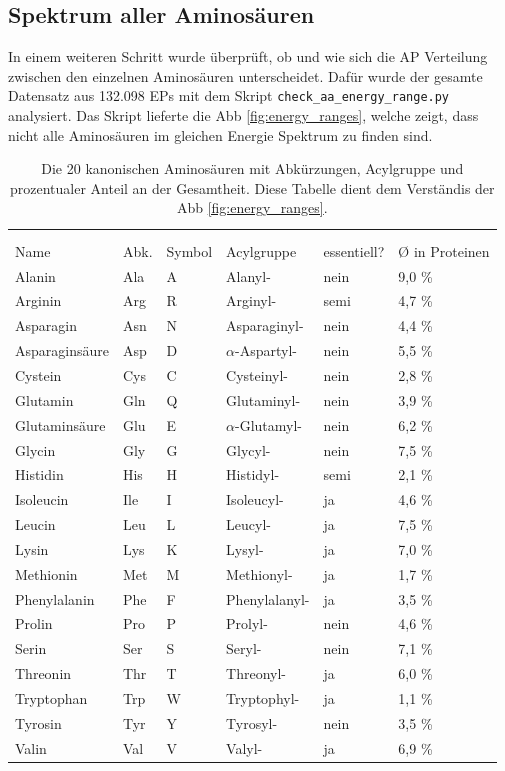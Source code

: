 \subsection{Spektrum aller Aminosäuren}
In einem weiteren Schritt wurde überprüft, ob und wie sich die \ac{AP} Verteilung zwischen den einzelnen Aminosäuren unterscheidet. Dafür wurde der gesamte Datensatz aus 132.098 \ac{EPs} mit dem Skript \texttt{check\_aa\_energy\_range.py} analysiert. Das Skript lieferte die \ac{Abb} \ref{fig:energy_ranges}, welche zeigt, dass nicht alle Aminosäuren im gleichen Energie Spektrum zu finden sind. %
\begin{table}[]
\centering
\begin{tabular}{llllll}
 &  &  &  &  &  \\
 &  &  &  &  &  \\ \hline
\multicolumn{1}{|l|}{Name} & \multicolumn{1}{l|}{Abk.} & \multicolumn{1}{l|}{Symbol} & \multicolumn{1}{l|}{Acylgruppe} & \multicolumn{1}{l|}{essentiell?} & \multicolumn{1}{l|}{Ø in Proteinen} \\ \hline
Alanin & Ala & A & Alanyl- & nein & 9,0 \% \\
Arginin & Arg & R & Arginyl- & semi & 4,7 \% \\
Asparagin & Asn & N & Asparaginyl- & nein & 4,4 \% \\
Asparaginsäure & Asp & D & $\alpha$-Aspartyl- & nein & 5,5 \% \\
Cystein & Cys & C & Cysteinyl- & nein & 2,8 \% \\
Glutamin & Gln & Q & Glutaminyl- & nein & 3,9 \% \\
Glutaminsäure & Glu & E & $\alpha$-Glutamyl- & nein & 6,2 \% \\
Glycin & Gly & G & Glycyl- & nein & 7,5 \% \\
Histidin & His & H & Histidyl- & semi & 2,1 \% \\
Isoleucin & Ile & I & Isoleucyl- & ja & 4,6 \% \\
Leucin & Leu & L & Leucyl- & ja & 7,5 \% \\
Lysin & Lys & K & Lysyl- & ja & 7,0 \% \\
Methionin & Met & M & Methionyl- & ja & 1,7 \% \\
Phenylalanin & Phe & F & Phenylalanyl- & ja & 3,5 \% \\
Prolin & Pro & P & Prolyl- & nein & 4,6 \% \\
Serin & Ser & S & Seryl- & nein & 7,1 \% \\
Threonin & Thr & T & Threonyl- & ja & 6,0 \% \\
Tryptophan & Trp & W & Tryptophyl- & ja & 1,1 \% \\
Tyrosin & Tyr & Y & Tyrosyl- & nein & 3,5 \% \\
Valin & Val & V & Valyl- & ja & 6,9 \%
\end{tabular}
\caption{Die 20 kanonischen Aminosäuren mit Abkürzungen, Acylgruppe und prozentualer Anteil an der Gesamtheit\protect\footnotemark. Diese Tabelle dient dem Verständis der \ac{Abb} \ref{fig:energy_ranges}.}
\label{tab:amino_table}
\end{table}

